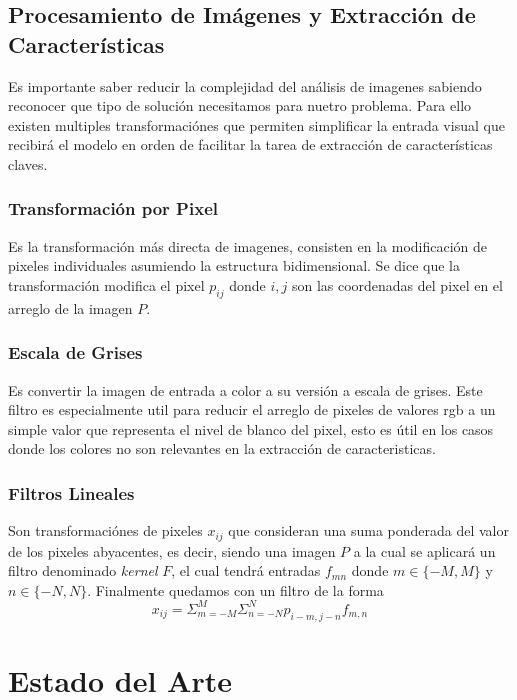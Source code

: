 \documentclass[letter,12pt]{report}
\begin{document}
\subsection{Procesamiento de Imágenes y Extracción de Características}
Es importante saber reducir la complejidad del análisis de imagenes sabiendo reconocer
que tipo de solución necesitamos para nuetro problema. Para ello existen multiples
transformaciónes que permiten simplificar la entrada visual que recibirá el modelo en
orden de facilitar la tarea de extracción de características claves\cite{Prince}.

\subsubsection{Transformación por Pixel}
Es la transformación más directa de imagenes\cite{Pixel}, consisten en la modificación de
pixeles individuales asumiendo la estructura bidimensional. Se dice que la transformación
modifica el pixel $p_{ij}$ donde $i, j$ son las coordenadas del pixel en el arreglo de la
imagen $P$.

\subsubsection{Escala de Grises}
Es convertir la imagen de entrada a color a su versión a escala de grises. Este filtro es
especialmente util para reducir el arreglo de pixeles de valores rgb a un simple valor
que representa el nivel de blanco del pixel, esto es útil en los casos donde los colores
no son relevantes en la extracción de caracteristicas\cite{Pixel}.

\subsubsection{Filtros Lineales}
Son transformaciónes de pixeles $x_{ij}$ que consideran una suma ponderada del valor de
los pixeles abyacentes\cite{Conv}, es decir, siendo una imagen $P$ a la cual se  aplicará
un filtro denominado \textit{kernel} $F$, el cual tendrá entradas $f_{mn}$ donde
$m\in\{-M,M\}$ y $n\in\{-N,N\}$. Finalmente quedamos con un filtro de la forma
$$x_{ij}=\Sigma_{m=-M}^M\Sigma_{n=-N}^Np_{i-m,j-n}f_{m,n}$$

\section{Estado del Arte}\label{arte}
\end{document}
